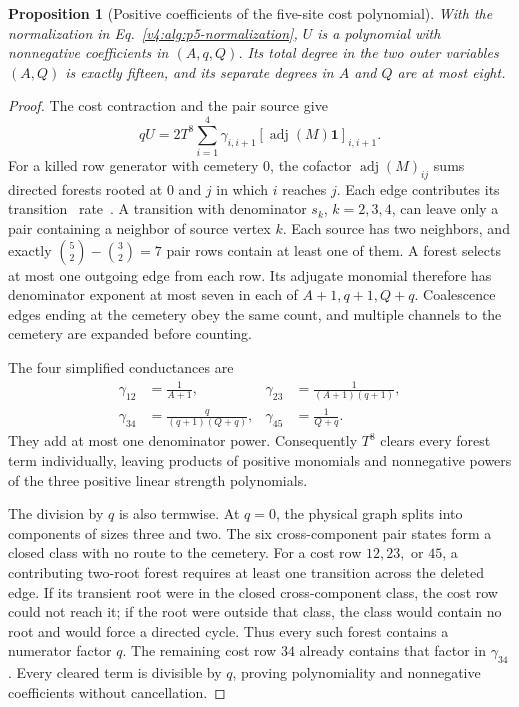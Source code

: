 \documentclass[aps,pre,reprint,amsmath,amssymb,longbibliography]{revtex4-2}
\newtheorem{proposition}[theorem]{Proposition}
\begin{document}
\begin{proposition}[Positive coefficients of the five-site cost polynomial]
\label{v4:alg:p5-cost-positive}
With the normalization in Eq.~\eqref{v4:alg:p5-normalization}, $U$ is a polynomial
with nonnegative coefficients in $(A,q,Q)$. Its total degree in the two
outer variables $(A,Q)$ is exactly fifteen, and its separate degrees in
$A$ and $Q$ are at most eight.
\end{proposition}
\begin{proof}
The cost contraction and the pair source give
\begin{equation}
 qU=2T^8\sum_{i=1}^4\gamma_{i,i+1}
          [\operatorname{adj}(M)\mathbf1]_{i,i+1}.
 \label{v4:alg:p5-cost-forest}
\end{equation}
For a killed row generator with cemetery $0$, the cofactor
$\operatorname{adj}(M)_{ij}$ sums directed forests rooted at $0$ and
$j$ in which $i$ reaches $j$. Each edge contributes its transition~
rate~\cite{AGNamGunawardena2025}.
A transition with denominator $s_k$, $k=2,3,4$, can leave only a pair
containing a neighbor of source vertex $k$. Each source has two neighbors,
and exactly $\binom52-\binom32=7$ pair rows contain at least one of them.
A forest selects at most one outgoing edge from each row. Its adjugate
monomial therefore has denominator exponent at most seven in each of
$A+1,q+1,Q+q$. Coalescence edges ending at the cemetery obey the same
count, and multiple channels to the cemetery are expanded before counting.

The four simplified conductances are
\begin{equation}
 \begin{aligned}
 \gamma_{12}&=\frac1{A+1},&
 \gamma_{23}&=\frac1{(A+1)(q+1)},\\
 \gamma_{34}&=\frac q{(q+1)(Q+q)},&
 \gamma_{45}&=\frac1{Q+q}.
 \end{aligned}
 \label{v4:alg:p5-conductances}
\end{equation}
They add at most one denominator power. Consequently $T^8$ clears every
forest term individually, leaving products of positive monomials and
nonnegative powers of the three positive linear strength polynomials.

The division by $q$ is also termwise. At $q=0$, the physical graph splits
into components of sizes three and two. The six cross-component pair
states form a closed class with no route to the cemetery. For a cost row
$12,23,$ or $45$, a contributing two-root forest requires at least one
transition across the deleted edge. If its transient root were in the
closed cross-component class, the cost row could not reach it; if the
root were outside that class, the class would contain no root and would
force a directed cycle. Thus every such forest contains a numerator
factor $q$. The remaining cost row $34$ already contains that factor in
$\gamma_{34}$. Every cleared term is divisible by $q$, proving polynomiality
and nonnegative coefficients without cancellation.


\end{proof}
\end{document}
